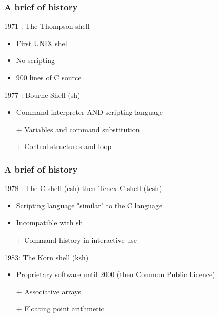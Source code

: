 \documentclass[aspectratio=169,10pt]{beamer}
\begin{document}
\begin{frame}
    \frametitle{A brief of history}

    1971 : The Thompson shell
    \begin{itemize}
        \item First UNIX shell
        \item No scripting
        \item 900 lines of C source
    \end{itemize}

    \vspace{\baselineskip}

    1977 : Bourne Shell (sh)
    \begin{itemize}
        \item Command interpreter AND scripting language
        \item [+] Variables and command substitution
        \item [+] Control structures and loop
    \end{itemize}

\end{frame}

\begin{frame}
    \frametitle{A brief of history}

    1978 : The C shell (csh) then Tenex C shell (tcsh)
    \begin{itemize}
        \item Scripting language "similar" to the C language
        \item Incompatible with sh
        \item [+] Command history in interactive use
    \end{itemize}

    \vspace{\baselineskip}

    1983: The Korn shell (ksh)
    \begin{itemize}
        \item Proprietary software until 2000 (then Common Public Licence)
        \item [+] Associative arrays
        \item [+] Floating point arithmetic
    \end{itemize}

\end{frame}
\end{document}
